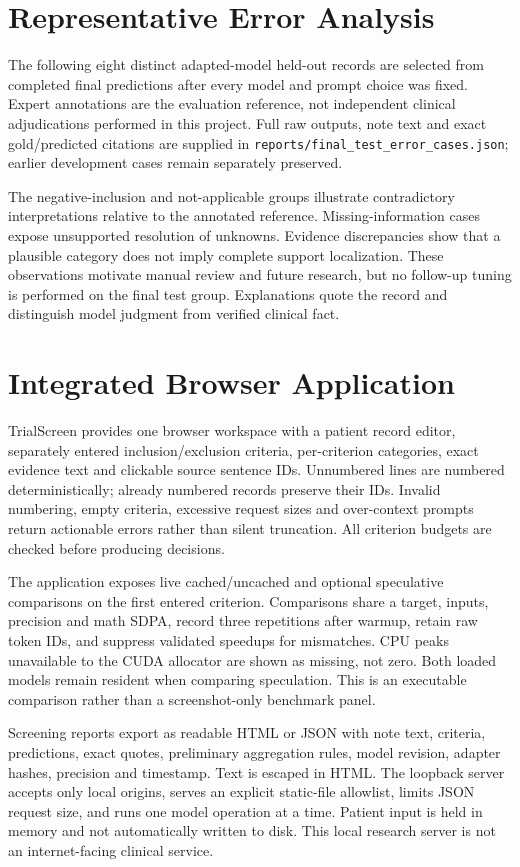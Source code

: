 \documentclass[conference]{IEEEtran}
\newcommand{\code}[1]{\texttt{#1}}
\begin{document}
\section{Representative Error Analysis}
The following eight distinct adapted-model held-out records are selected from completed final predictions after every model and prompt choice was fixed. Expert annotations are the evaluation reference, not independent clinical adjudications performed in this project. Full raw outputs, note text and exact gold/predicted citations are supplied in \code{reports/final\_test\_error\_cases.json}; earlier development cases remain separately preserved.

The negative-inclusion and not-applicable groups illustrate contradictory interpretations relative to the annotated reference. Missing-information cases expose unsupported resolution of unknowns. Evidence discrepancies show that a plausible category does not imply complete support localization. These observations motivate manual review and future research, but no follow-up tuning is performed on the final test group. Explanations quote the record and distinguish model judgment from verified clinical fact.

\section{Integrated Browser Application}
TrialScreen provides one browser workspace with a patient record editor, separately entered inclusion/exclusion criteria, per-criterion categories, exact evidence text and clickable source sentence IDs. Unnumbered lines are numbered deterministically; already numbered records preserve their IDs. Invalid numbering, empty criteria, excessive request sizes and over-context prompts return actionable errors rather than silent truncation. All criterion budgets are checked before producing decisions.

The application exposes live cached/uncached and optional speculative comparisons on the first entered criterion. Comparisons share a target, inputs, precision and math SDPA, record three repetitions after warmup, retain raw token IDs, and suppress validated speedups for mismatches. CPU peaks unavailable to the CUDA allocator are shown as missing, not zero. Both loaded models remain resident when comparing speculation. This is an executable comparison rather than a screenshot-only benchmark panel.

Screening reports export as readable HTML or JSON with note text, criteria, predictions, exact quotes, preliminary aggregation rules, model revision, adapter hashes, precision and timestamp. Text is escaped in HTML. The loopback server accepts only local origins, serves an explicit static-file allowlist, limits JSON request size, and runs one model operation at a time. Patient input is held in memory and not automatically written to disk. This local research server is not an internet-facing clinical service.
\end{document}
